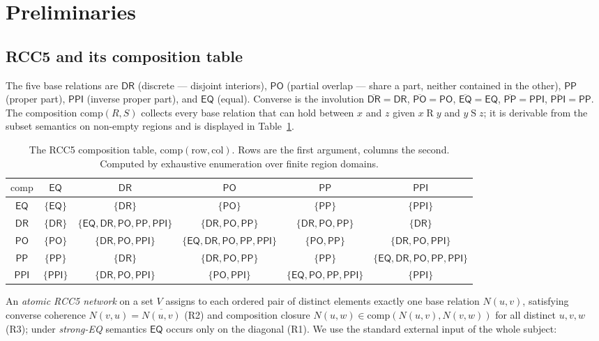 \documentclass[11pt]{article}
\newcommand{\Comp}{\mathrm{comp}}
\newcommand{\DR}{\mathsf{DR}}
\newcommand{\PO}{\mathsf{PO}}
\newcommand{\PP}{\mathsf{PP}}
\newcommand{\PPI}{\mathsf{PPI}}
\newcommand{\EQ}{\mathsf{EQ}}
\theoremstyle{plain}
\theoremstyle{definition}
\begin{document}
\section{Preliminaries}\label{sec:prelim}

\subsection{RCC5 and its composition table}

The five base relations are $\DR$ (discrete --- disjoint interiors),
$\PO$ (partial overlap --- share a part, neither contained in the
other), $\PP$ (proper part), $\PPI$ (inverse proper part), and $\EQ$
(equal). Converse is the involution
$\overline{\DR}=\DR$, $\overline{\PO}=\PO$, $\overline{\EQ}=\EQ$,
$\overline{\PP}=\PPI$, $\overline{\PPI}=\PP$. The composition
$\Comp(R,S)$ collects every base relation that can hold between $x$ and
$z$ given $x\mathbin{R}y$ and $y\mathbin{S}z$; it is derivable from the
subset semantics on non-empty regions and is displayed in
Table~\ref{tab:comp}.

\begin{table}[h]
\centering
\renewcommand{\arraystretch}{1.25}
\setlength{\tabcolsep}{4pt}
\begin{tabular}{c|ccccc}
$\Comp$ & $\EQ$ & $\DR$ & $\PO$ & $\PP$ & $\PPI$\\\hline
$\EQ$  & $\{\EQ\}$ & $\{\DR\}$ & $\{\PO\}$ & $\{\PP\}$ & $\{\PPI\}$\\
$\DR$  & $\{\DR\}$ & $\{\EQ,\DR,\PO,\PP,\PPI\}$ & $\{\DR,\PO,\PP\}$ & $\{\DR,\PO,\PP\}$ & $\{\DR\}$\\
$\PO$  & $\{\PO\}$ & $\{\DR,\PO,\PPI\}$ & $\{\EQ,\DR,\PO,\PP,\PPI\}$ & $\{\PO,\PP\}$ & $\{\DR,\PO,\PPI\}$\\
$\PP$  & $\{\PP\}$ & $\{\DR\}$ & $\{\DR,\PO,\PP\}$ & $\{\PP\}$ & $\{\EQ,\DR,\PO,\PP,\PPI\}$\\
$\PPI$ & $\{\PPI\}$ & $\{\DR,\PO,\PPI\}$ & $\{\PO,\PPI\}$ & $\{\EQ,\PO,\PP,\PPI\}$ & $\{\PPI\}$\\
\end{tabular}
\caption{The RCC5 composition table, $\Comp(\text{row},\text{col})$.
Rows are the first argument, columns the second. Computed by exhaustive
enumeration over finite region domains.}
\label{tab:comp}
\end{table}

An \emph{atomic RCC5 network} on a set $V$ assigns to each ordered pair
of distinct elements exactly one base relation $N(u,v)$, satisfying
converse coherence $N(v,u)=\overline{N(u,v)}$ (R2) and composition
closure $N(u,w)\in\Comp(N(u,v),N(v,w))$ for all distinct $u,v,w$ (R3);
under \emph{strong-EQ} semantics $\EQ$ occurs only on the diagonal
(R1). We use the standard external input of the whole subject:
\end{document}
